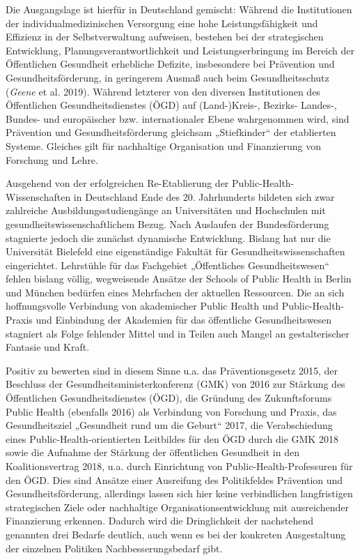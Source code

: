 \documentclass{article}
\begin{document}
Die Ausgangslage ist hierfür in Deutschland gemischt: Während die Institutionen der individualmedizinischen Versorgung eine hohe Leistungsfähigkeit und Effizienz in der Selbstverwaltung aufweisen, bestehen bei der strategischen Entwicklung, Planungsverantwortlichkeit und Leistungserbringung im Bereich der Öffentlichen Gesundheit erhebliche Defizite, insbesondere bei Prävention und Gesundheitsförderung, in geringerem Ausmaß auch beim Gesundheitsschutz (\emph{Geene} et al. 2019). Während letzterer von den diversen Institutionen des Öffentlichen Gesundheitsdienstes (ÖGD) auf (Land-)Kreis-, Bezirks- Landes-, Bundes- und europäischer bzw. internationaler Ebene wahrgenommen wird, sind Prävention und Gesundheitsförderung gleichsam „Stiefkinder“ der etablierten Systeme. Gleiches gilt für nachhaltige Organisation und Finanzierung von Forschung und Lehre. 


Ausgehend von der erfolgreichen Re-Etablierung der Public-Health-Wissenschaften in Deutschland Ende des 20. Jahrhunderts bildeten sich zwar zahlreiche Ausbildungsstudiengänge an Universitäten und Hochschulen mit gesundheitswissenschaftlichem Bezug. Nach Auslaufen der Bundesförderung stagnierte jedoch die zunächst dynamische Entwicklung. Bislang hat nur die Universität Bielefeld eine eigenständige Fakultät für Gesundheitswissenschaften eingerichtet. Lehrstühle für das Fachgebiet „Öffentliches Gesundheitswesen“ fehlen bislang völlig, wegweisende Ansätze der Schools of Public Health in Berlin und München bedürfen eines Mehrfachen der aktuellen Ressourcen. Die an sich hoffnungsvolle Verbindung von akademischer Public Health und Public-Health-Praxis und Einbindung der Akademien für das öffentliche Gesundheitswesen stagniert als Folge fehlender Mittel und in Teilen auch Mangel an gestalterischer Fantasie und Kraft. 


Positiv zu bewerten sind in diesem Sinne u.a. das Präventionsgesetz 2015, der Beschluss der Gesundheitsministerkonferenz (GMK) von 2016 zur Stärkung des Öffentlichen Gesundheitsdienstes (ÖGD), die Gründung des Zukunftsforums Public Health (ebenfalls 2016) als Verbindung von Forschung und Praxis, das Gesundheitsziel „Gesundheit rund um die Geburt“ 2017, die Verabschiedung eines Public-Health-orientierten Leitbildes für den ÖGD durch die GMK 2018 sowie die Aufnahme der Stärkung der öffentlichen Gesundheit in den Koalitionsvertrag 2018, u.a. durch Einrichtung von Public-Health-Professuren für den ÖGD. Dies sind Ansätze einer Ausreifung des Politikfeldes Prävention und Gesundheitsförderung, allerdings lassen sich hier keine verbindlichen langfristigen strategischen Ziele oder nachhaltige Organisationsentwicklung mit ausreichender Finanzierung erkennen. Dadurch wird die Dringlichkeit der nachstehend genannten drei Bedarfe deutlich, auch wenn es bei der konkreten Ausgestaltung der einzelnen Politiken Nachbesserungsbedarf gibt.
\end{document}
